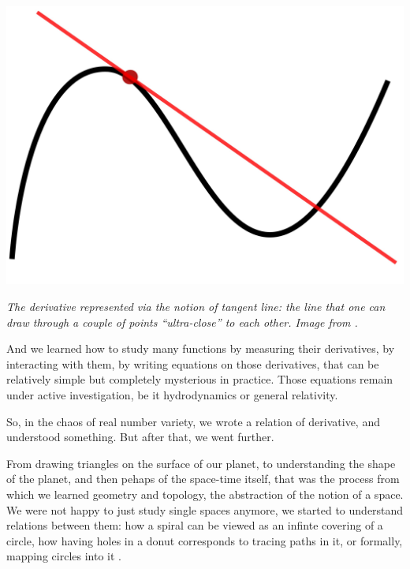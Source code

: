 \documentclass{article}
\begin{document}
\begin{center}
\includegraphics[scale=0.045]{Tangent_to_a_curve.jpg}

\textit{The derivative represented via the notion of tangent line: the line that one can draw through a couple of points ``ultra-close'' to each other. Image from \cite{DERIVATIVE}.}
\end{center}

 And we learned how to study many functions by measuring their derivatives, by interacting with them, by writing equations on those derivatives, that can be relatively simple but completely mysterious in practice. Those equations remain under active investigation, be it hydrodynamics or general relativity.

So, in the chaos of real number variety, we wrote a relation of derivative, and understood something. But after that, we went further.

From drawing triangles on the surface of our planet, to understanding the shape of the planet, and then pehaps of the space-time itself, that was the process from which we learned geometry and topology, the abstraction of the notion of a space. We were not happy to just study single spaces anymore, we started to understand relations between them: how a spiral can be viewed as an infinte covering of a circle, how having holes in a donut corresponds to tracing paths in it, or formally, mapping circles into it \cite{HATCHER}.
\end{document}
